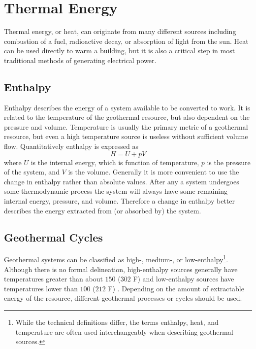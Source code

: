 \section{Thermal Energy}
Thermal energy, or heat, can originate from many different sources including combustion of a fuel, radioactive decay, or absorption of light from the sun. Heat can be used directly to warm a building, but it is also a critical step in most traditional methods of generating electrical power. 

\subsection{Enthalpy}
Enthalpy describes the energy of a system available to be converted to work. It is related to the temperature of the geothermal resource, but also dependent on the pressure and volume. Temperature is usually the primary metric of a geothermal resource, but even a high temperature source is useless without sufficient volume flow. Quantitatively enthalpy is expressed as 
\begin{equation}
H = U + pV
\end{equation}
where $U$ is the internal energy, which is function of temperature, $p$ is the pressure of the system, and $V$ is the volume. Generally it is more convenient to use the change in enthalpy rather than absolute values. After any a system undergoes some thermodynamic process the system will always have some remaining internal energy, pressure, and volume. Therefore a change in enthalpy better describes the energy extracted from (or absorbed by) the system.


\subsection{Geothermal Cycles}
Geothermal systems can be classified as high-, medium-, or low-enthalpy\footnote{While the technical definitions differ, the terms enthalpy, heat, and temperature are often used interchangeably when describing geothermal sources.}. Although there is no formal delineation, high-enthalpy sources generally have temperatures greater than about $150$ \textcelsius{} ($302$ \textdegree{}F) and low-enthalpy sources have temperatures lower than $100$ \textcelsius{} ($212$ \textdegree{}F) \cite{Norden2011}. Depending on the amount of extractable energy of the resource, different geothermal processes or cycles should be used.

